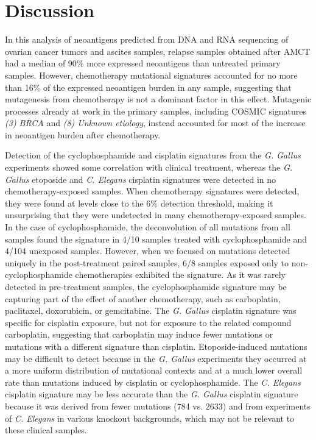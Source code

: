 \section*{Discussion}
In this analysis of neoantigens predicted from DNA and RNA sequencing of ovarian cancer tumors and ascites samples, relapse samples obtained after AMCT had a median of 90\% more expressed neoantigens than untreated primary samples. However, chemotherapy mutational signatures accounted for no more than 16\% of the expressed neoantigen burden in any sample, suggesting that mutagenesis from chemotherapy is not a dominant factor in this effect. Mutagenic processes already at work in the primary samples, including COSMIC signatures \textit{(3) BRCA} and \textit{(8) Unknown etiology}, instead accounted for most of the increase in neoantigen burden after chemotherapy.

Detection of the cyclophosphamide and cisplatin signatures from the \textit{G. Gallus} experiments showed some correlation with clinical treatment, whereas the \textit{G. Gallus} etoposide and \textit{C. Elegans} cisplatin signatures were detected in no chemotherapy-exposed samples. When chemotherapy signatures were detected, they were found at levels close to the 6\% detection threshold, making it unsurprising that they were undetected in many chemotherapy-exposed samples. In the case of cyclophosphamide, the deconvolution of all mutations from all samples found the signature in 4/10 samples treated with cyclophosphamide and 4/104 unexposed samples. However, when we focused on mutations detected uniquely in the post-treatment paired samples, 6/8 samples exposed only to non-cyclophosphamide chemotherapies exhibited the signature. As it was rarely detected in pre-treatment samples, the cyclophosphamide signature may be capturing part of the effect of another chemotherapy, such as carboplatin, paclitaxel, doxorubicin, or gemcitabine. The \textit{G. Gallus} cisplatin signature was specific for cisplatin exposure, but not for exposure to the related compound carboplatin, suggesting that carboplatin may induce fewer mutations or mutations with a different signature than cisplatin. Etoposide-induced mutations may be difficult to detect because in the \textit{G. Gallus} experiments they occurred at a more uniform distribution of mutational contexts and at a much lower overall rate than mutations induced by cisplatin or cyclophosphamide. The \textit{C. Elegans} cisplatin signature may be less accurate than the \textit{G. Gallus} cisplatin signature because it was derived from fewer mutations (784 vs. 2633) and from experiments of \textit{C. Elegans} in various knockout backgrounds, which may not be relevant to these clinical samples.

